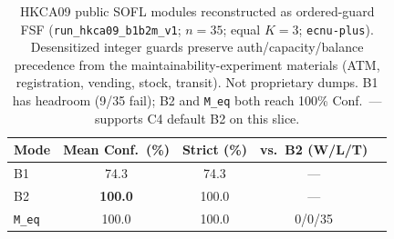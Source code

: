 \begin{table}[t]
  \centering
  \caption{HKCA09 public SOFL modules reconstructed as ordered-guard FSF
    (\texttt{run\_hkca09\_b1b2m\_v1}; $n{=}35$; equal $K{=}3$;
    \texttt{ecnu-plus}).
    Desensitized integer guards preserve auth/capacity/balance precedence
    from the maintainability-experiment materials (ATM, registration,
    vending, stock, transit). Not proprietary dumps.
    B1 has headroom (9/35 fail); B2 and \texttt{M\_eq} both reach 100\%
    Conf.\ --- supports C4 default B2 on this slice.}
  \label{tab:hkca09-ranking}
  \footnotesize
  \begin{tabular}{lcccc}
    \toprule
    Mode & Mean Conf.\ (\%) & Strict (\%) & vs.\ B2 (W/L/T) \\
    \midrule
    B1 & 74.3 & 74.3 & --- \\
    B2 & \textbf{100.0} & 100.0 & --- \\
    \texttt{M\_eq} & 100.0 & 100.0 & 0/0/35 \\
    \bottomrule
  \end{tabular}
\end{table}
